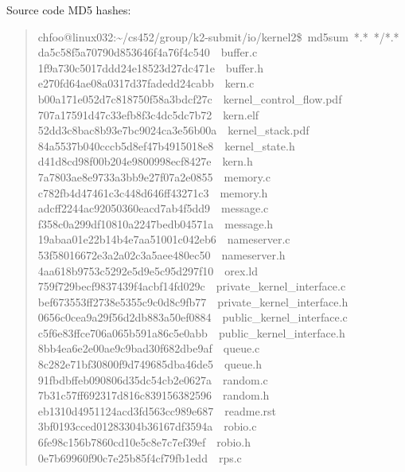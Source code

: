 \documentclass[letterpaper, 12pt]{article}
\begin{document}
Source code MD5 hashes:
%
\begin{quote}{\ttfamily \raggedright \noindent
chfoo@linux032:\textasciitilde{}/cs452/group/k2-submit/io/kernel2\$~md5sum~*.*~*/*.*\\
da5c58f5a70790d853646f4a76f4c540~~buffer.c\\
1f9a730c5017ddd24e18523d27dc471e~~buffer.h\\
e270fd64ae08a0317d37fadedd24cabb~~kern.c\\
b00a171e052d7c818750f58a3bdcf27c~~kernel\_control\_flow.pdf\\
707a17591d47c33efb8f3c4dc5dc7b72~~kern.elf\\
52dd3c8bac8b93e7bc9024ca3e56b00a~~kernel\_stack.pdf\\
84a5537b040cccb5d8ef47b4915018e8~~kernel\_state.h\\
d41d8cd98f00b204e9800998ecf8427e~~kern.h\\
7a7803ae8e9733a3bb9e27f07a2e0855~~memory.c\\
c782fb4d47461c3c448d646ff43271c3~~memory.h\\
adcff2244ac92050360eacd7ab4f5dd9~~message.c\\
f358c0a299df10810a2247bedb04571a~~message.h\\
19abaa01e22b14b4e7aa51001c042eb6~~nameserver.c\\
53f58016672e3a2a02c3a5aee480ec50~~nameserver.h\\
4aa618b9753c5292e5d9e5c95d297f10~~orex.ld\\
759f729becf9837439f4acbf14fd029c~~private\_kernel\_interface.c\\
bef673553ff2738e5355c9c0d8c9fb77~~private\_kernel\_interface.h\\
0656c0cea9a29f56d2db883a50ef0884~~public\_kernel\_interface.c\\
c5f6e83ffce706a065b591a86c5e0abb~~public\_kernel\_interface.h\\
8bb4ea6e2e00ae9c9bad30f682dbe9af~~queue.c\\
8c282e71bf30800f9d749685dba46de5~~queue.h\\
91fbdbffeb090806d35dc54cb2e0627a~~random.c\\
7b31c57ff692317d816c839156382596~~random.h\\
eb1310d4951124acd3fd563cc989e687~~readme.rst\\
3bf0193cced01283304b36167df3594a~~robio.c\\
6fe98c156b7860cd10e5c8e7c7ef39ef~~robio.h\\
0e7b69960f90c7e25b85f4cf79fb1edd~~rps.c\\
}
\end{quote}
\end{document}
